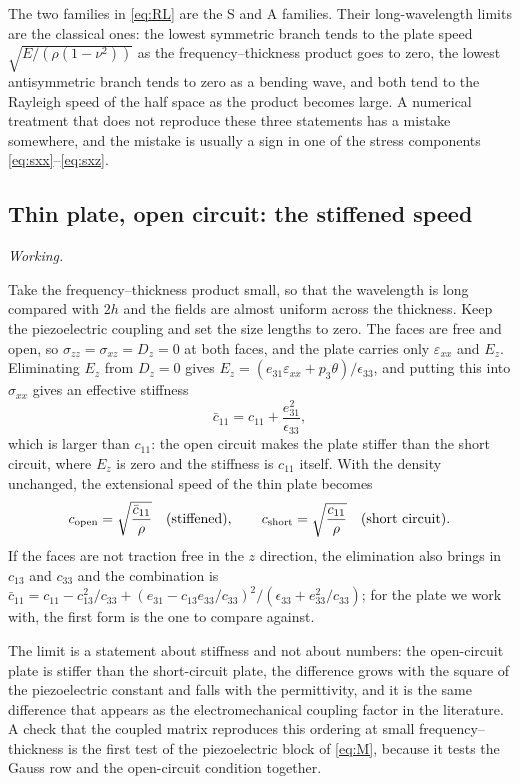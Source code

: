 \documentclass[11pt,a4paper]{article}
\newif\ifshowworked \showworkedtrue
\newenvironment{worked}{\ifshowworked\par\smallskip\noindent\textit{Working.}\par\else\setbox0\vbox\bgroup\fi}{\ifshowworked\par\smallskip\else\egroup\fi}
\newcommand{\eps}{\varepsilon}
\begin{document}
\noindent The two families in \eqref{eq:RL} are the S and A families. Their long-wavelength limits are the
classical ones: the lowest symmetric branch tends to the plate speed $\sqrt{E/(\rho(1-\nu^2))}$ as the
frequency--thickness product goes to zero, the lowest antisymmetric branch tends to zero as a bending wave,
and both tend to the Rayleigh speed of the half space as the product becomes large. A numerical treatment
that does not reproduce these three statements has a mistake somewhere, and the mistake is usually a sign
in one of the stress components \eqref{eq:sxx}--\eqref{eq:sxz}.

\subsection{Thin plate, open circuit: the stiffened speed}

\begin{worked}
Take the frequency--thickness product small, so that the wavelength is long compared with $2h$ and the
fields are almost uniform across the thickness. Keep the piezoelectric coupling and set the size lengths to
zero. The faces are free and open, so $\sigma_{zz}=\sigma_{xz}=D_z=0$ at both faces, and the plate carries
only $\eps_{xx}$ and $E_z$. Eliminating $E_z$ from $D_z=0$ gives
$E_z=(e_{31}\eps_{xx}+p_3\theta)/\epsilon_{33}$, and putting this into $\sigma_{xx}$ gives an effective
stiffness
\[
\bar c_{11}=c_{11}+\frac{e_{31}^2}{\epsilon_{33}} ,
\]
which is larger than $c_{11}$: the open circuit makes the plate stiffer than the short circuit, where $E_z$
is zero and the stiffness is $c_{11}$ itself. With the density unchanged, the extensional speed of the thin
plate becomes
\[
c_{\rm open}=\sqrt{\frac{\bar c_{11}}{\rho}}\quad(\text{stiffened}),\qquad
c_{\rm short}=\sqrt{\frac{c_{11}}{\rho}}\quad(\text{short circuit}).
\]
If the faces are not traction free in the $z$ direction, the elimination also brings in $c_{13}$ and $c_{33}$
and the combination is $\bar c_{11}=c_{11}-c_{13}^2/c_{33}+(e_{31}-c_{13}e_{33}/c_{33})^2/(\epsilon_{33}+e_{33}^2/c_{33})$;
for the plate we work with, the first form is the one to compare against.
\end{worked}

\noindent The limit is a statement about stiffness and not about numbers: the open-circuit plate is stiffer
than the short-circuit plate, the difference grows with the square of the piezoelectric constant and falls
with the permittivity, and it is the same difference that appears as the electromechanical coupling factor in
the literature. A check that the coupled matrix reproduces this ordering at small frequency--thickness is the
first test of the piezoelectric block of \eqref{eq:M}, because it tests the Gauss row and the open-circuit
condition together.
\end{document}
